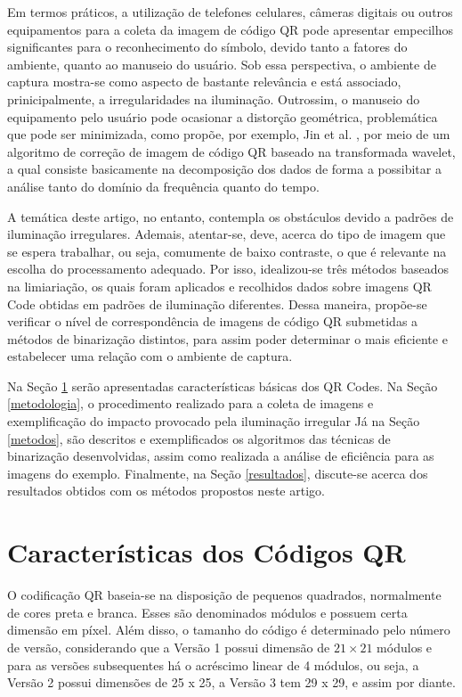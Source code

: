 \documentclass{ceel}
\begin{document}
\begin{multicols}{2}
Em termos práticos, a utilização de telefones celulares, câmeras digitais ou outros equipamentos para a coleta da imagem de código QR pode apresentar empecilhos significantes para o reconhecimento do símbolo, devido tanto a fatores do ambiente, quanto ao manuseio do usuário. Sob essa perspectiva, o ambiente de captura mostra-se como aspecto de bastante relevância e está associado, prinicipalmente, a irregularidades na iluminação. Outrossim, o manuseio do equipamento pelo usuário pode ocasionar a distorção geométrica, problemática que pode ser minimizada, como propõe, por exemplo, Jin et al. \cite{j-chen}, por meio de um algoritmo de correção de imagem de código QR baseado na transformada wavelet, a qual consiste basicamente na decomposição dos dados de forma a possibitar a análise tanto do domínio da frequência quanto do tempo.

A temática deste artigo, no entanto, contempla os obstáculos devido a padrões de iluminação irregulares. Ademais, atentar-se, deve, acerca do tipo de imagem que se espera trabalhar, ou seja, comumente de baixo contraste, o que é relevante na escolha do processamento adequado. Por isso, idealizou-se três métodos baseados na limiariação, os quais foram aplicados e recolhidos dados sobre imagens QR Code obtidas em padrões de iluminação diferentes. Dessa maneira, propõe-se verificar o nível de correspondência de imagens de código QR submetidas a métodos de binarização distintos, para assim poder determinar o mais eficiente e estabelecer uma relação com o ambiente de captura.

Na Seção \ref{caracteristicas} serão apresentadas características básicas dos QR Codes. Na Seção \ref{metodologia}, o procedimento realizado para a coleta de imagens e exemplificação do impacto provocado pela iluminação irregular Já na Seção \ref{metodos}, são descritos e exemplificados os algoritmos das técnicas de binarização desenvolvidas, assim como realizada a análise de eficiência para as imagens do exemplo. Finalmente, na Seção \ref{resultados}, discute-se acerca dos resultados obtidos com os métodos propostos neste artigo.


\section{Características dos Códigos QR} \label{caracteristicas}
O codificação QR baseia-se na disposição de pequenos quadrados, normalmente de cores preta e branca. Esses são denominados módulos e possuem certa dimensão em píxel. Além disso, o tamanho do código é determinado pelo número de versão, considerando que a Versão 1 possui dimensão de $21\times21$ módulos e para as versões subsequentes há o acréscimo linear de 4 módulos, ou seja, a Versão 2 possui dimensões de 25 x 25, a Versão 3 tem 29 x 29, e assim por diante. 


\end{multicols}
\end{document}
